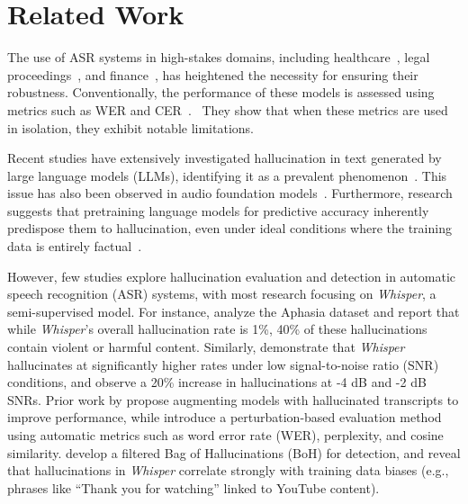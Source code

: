 \section{Related Work}\label{sec:related_work}
The use of ASR systems in high-stakes domains, including healthcare~\cite{afonja2024performantasrmodelsmedical, huh2023improvingmedicalspeechtotextaccuracy, adedeji2024sound, sunder2022buildingasrerrorrobust}, legal proceedings~\cite{saadany2022bettertranscriptionuksupreme, garneau2024statecommercialautomaticfrench}, and finance~\cite{Del_Rio_2021, 10389617}, has heightened the necessity for ensuring their robustness. Conventionally, the performance of these models is assessed using metrics such as WER and CER~\cite{serai2022hallucination}.~\citet{szymanski-etal-2023-arent, sasindran2024semascore} They show that when these metrics are used in isolation, they exhibit notable limitations.

Recent studies have extensively investigated hallucination in text generated by large language models (LLMs), identifying it as a prevalent phenomenon~\cite{Huang_2025, bai2024hallucinationmultimodallargelanguage, yao2023llm, jiang2024surveylargelanguagemodel,maynez2020faithfulness,parikh2020totto,ji2023survey,mittal2024towards,filippova2020controlled}. This issue has also been observed in audio foundation models~\cite{sahoo2024comprehensivesurveyhallucinationlarge}. Furthermore, research suggests that pretraining language models for predictive accuracy inherently predispose them to hallucination, even under ideal conditions where the training data is entirely factual~\cite{kalai2024calibrated}. 

However, few studies explore hallucination evaluation and detection in automatic speech recognition (ASR) systems, with most research focusing on \emph{Whisper}, a semi-supervised model. For instance, \citet{koenecke2024careless} analyze the Aphasia dataset and report that while \emph{Whisper}’s overall hallucination rate is 1\%, 40\% of these hallucinations contain violent or harmful content. Similarly, \citet{kim2024automatic} demonstrate that \emph{Whisper} hallucinates at significantly higher rates under low signal-to-noise ratio (SNR) conditions, and observe a 20\% increase in hallucinations at -4 dB and -2 dB SNRs. Prior work by \citet{serai2021hallucinationspeechrecognitionerrors} propose augmenting models with hallucinated transcripts to improve performance, while \citet{frieske2024hallucinations} introduce a perturbation-based evaluation method using automatic metrics such as word error rate (WER), perplexity, and cosine similarity. \citet{baranski2025investigation} develop a filtered Bag of Hallucinations (BoH) for detection, and reveal that hallucinations in \emph{Whisper} correlate strongly with training data biases (e.g., phrases like ``Thank you for watching'' linked to YouTube content).


